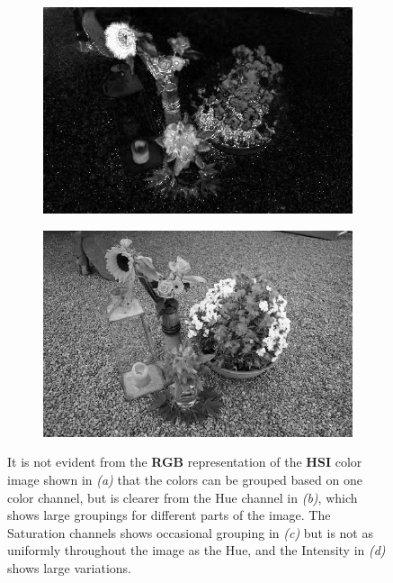 \begin{figure}[H]
\begin{subfigure}[b]{0.49\textwidth}
		\caption{}
		\label{fig:imgH}
    \end{subfigure}
    \begin{subfigure}[b]{0.49\textwidth}
        \centering
        \includegraphics[width=\textwidth]{./figure/appendix/color_rep/images/imgS.jpg}
		\caption{}
		\label{fig:imgS}
    \end{subfigure}
    \begin{subfigure}[b]{0.49\textwidth}
        \centering
        \includegraphics[width=\textwidth]{./figure/appendix/color_rep/images/imgI.jpg}
		\caption{}
		\label{fig:imgI}
    \end{subfigure}
    \caption{It is not evident from the \textbf{RGB} representation of the \textbf{HSI} color image shown in \textit{(a)} that the colors can be grouped based on one color channel, but is clearer from the Hue channel in \textit{(b)}, which shows large groupings for different parts of the image. The Saturation channels shows occasional grouping in \textit{(c)} but is not as uniformly throughout the image as the Hue, and the Intensity in \textit{(d)} shows large variations.}
    \label{fig:hsiChannels}
\end{figure}

